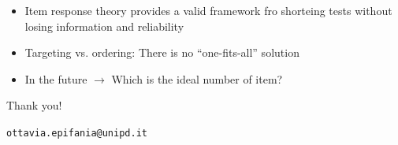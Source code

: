 \documentclass{beamer} %
\begin{document}
\begin{frame}


\begin{itemize}

\item Item response theory provides a valid framework fro shorteing tests without losing information and reliability 

\vspace{1.5mm}

\item Targeting vs. ordering: There is no ``one-fits-all'' solution 

\vspace{1.5mm}

\item In the future $\rightarrow$ Which is the ideal number of item? 

\end{itemize}
\end{frame}

\begin{frame}[plain]
	\vspace{2cm}
	\begin{center}
		\large{Thank you!}
		
		\vspace{3mm}
		\texttt{ottavia.epifania@unipd.it}
		
	
	
	\end{center}
\end{frame}
\end{document}
